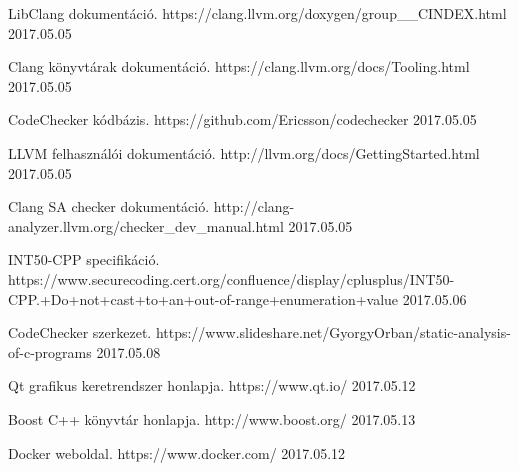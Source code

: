 \documentclass[a4paper,12pt]{report}
\begin{document}
\begin{thebibliography}{xx}
 LibClang dokumentáció. https://clang.llvm.org/doxygen/group\_\_CINDEX.html 2017.05.05

 Clang könyvtárak dokumentáció. https://clang.llvm.org/docs/Tooling.html 2017.05.05

 CodeChecker kódbázis. https://github.com/Ericsson/codechecker 2017.05.05

 LLVM felhasználói dokumentáció. http://llvm.org/docs/GettingStarted.html 2017.05.05

 Clang SA checker dokumentáció. http://clang-analyzer.llvm.org/checker\_dev\_manual.html 2017.05.05

 INT50-CPP specifikáció. https://www.securecoding.cert.org/confluence/display/cplusplus/INT50-CPP.+Do+not+cast+to+an+out-of-range+enumeration+value 2017.05.06

 CodeChecker szerkezet. https://www.slideshare.net/GyorgyOrban/static-analysis-of-c-programs 2017.05.08

 Qt grafikus keretrendszer honlapja. https://www.qt.io/ 2017.05.12

 Boost C++ könyvtár honlapja. http://www.boost.org/ 2017.05.13

 Docker weboldal. https://www.docker.com/ 2017.05.12

\end{thebibliography}
\end{document}
